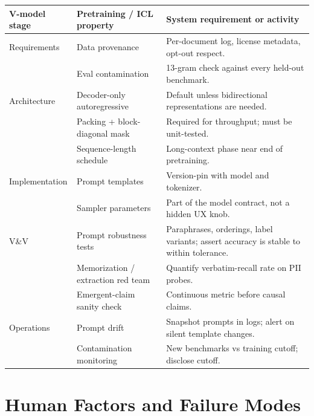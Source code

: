 \begin{center}
\begin{tabular}{|p{3.4cm}|p{3.4cm}|p{6.8cm}|}
\hline
V-model stage & Pretraining / ICL property & System requirement or activity \\
\hline
Requirements & Data provenance & Per-document log, license metadata,
   opt-out respect. \\
 & Eval contamination & 13-gram check against every held-out
   benchmark. \\
\hline
Architecture & Decoder-only autoregressive
             & Default unless bidirectional representations are
               needed. \\
 & Packing + block-diagonal mask
             & Required for throughput; must be unit-tested. \\
 & Sequence-length schedule & Long-context phase near end of
   pretraining. \\
\hline
Implementation & Prompt templates & Version-pin with model and
   tokenizer. \\
 & Sampler parameters & Part of the model contract,
   not a hidden UX knob. \\
\hline
V\&V & Prompt robustness tests & Paraphrases, orderings, label
   variants; assert accuracy is stable to within tolerance. \\
 & Memorization / extraction red team
     & Quantify verbatim-recall rate on PII probes. \\
 & Emergent-claim sanity check & Continuous metric before
   causal claims. \\
\hline
Operations & Prompt drift & Snapshot prompts in logs; alert on
   silent template changes. \\
 & Contamination monitoring & New benchmarks vs training
   cutoff; disclose cutoff. \\
\hline
\end{tabular}
\end{center}

\section{Human Factors and Failure Modes}

